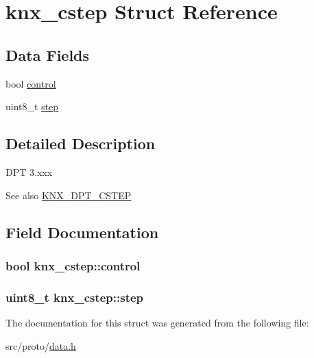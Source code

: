 \hypertarget{structknx__cstep}{}\section{knx\+\_\+cstep Struct Reference}
\label{structknx__cstep}
\subsection*{Data Fields}
\begin{DoxyCompactItemize}
\item 
bool \hyperlink{structknx__cstep_a20f6e2cecf1ec97ba0e8c7392ee8ef61}{control}
\item 
uint8\+\_\+t \hyperlink{structknx__cstep_af057eab4a51cc1f226448ecd8790f880}{step}
\end{DoxyCompactItemize}


\subsection{Detailed Description}
D\+PT 3.\+xxx \begin{DoxySeeAlso}{See also}
\hyperlink{data_8h_a6e79f8a1b8ff1d0dff30d1fdb401b642afbc1887f36b40c7a46e78f8b707f901f}{K\+N\+X\+\_\+\+D\+P\+T\+\_\+\+C\+S\+T\+EP} 
\end{DoxySeeAlso}


\subsection{Field Documentation}
\subsubsection[{\texorpdfstring{control}{control}}]{\setlength{\rightskip}{0pt plus 5cm}bool knx\+\_\+cstep\+::control}\hypertarget{structknx__cstep_a20f6e2cecf1ec97ba0e8c7392ee8ef61}{}\label{structknx__cstep_a20f6e2cecf1ec97ba0e8c7392ee8ef61}
\subsubsection[{\texorpdfstring{step}{step}}]{\setlength{\rightskip}{0pt plus 5cm}uint8\+\_\+t knx\+\_\+cstep\+::step}\hypertarget{structknx__cstep_af057eab4a51cc1f226448ecd8790f880}{}\label{structknx__cstep_af057eab4a51cc1f226448ecd8790f880}


The documentation for this struct was generated from the following file\+:\begin{DoxyCompactItemize}
\item 
src/proto/\hyperlink{data_8h}{data.\+h}\end{DoxyCompactItemize}
